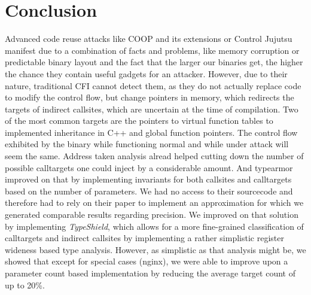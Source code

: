\chapter{Conclusion}
\label{chapter:Conclusion}
Advanced code reuse attacks like COOP and its extensions or Control Jujutsu manifest due to a combination of facts and problems, 
like memory corruption or predictable binary layout and the fact that the larger our binaries get, the 
higher the chance they contain useful gadgets for an attacker. However, due to their nature, traditional 
CFI cannot detect them, as they do not actually replace code to modify the control flow, but change pointers
in memory, which redirects the targets of indirect callsites, which are uncertain at the time of compilation. 
Two of the most common targets are the pointers to virtual function tables to implemented inheritance in C++ 
and global function pointers. The control flow exhibited by the binary while functioning normal and while 
under attack will seem the same. Address taken analysis alread helped cutting down the number of possible 
calltargets one could inject by a considerable amount. And typearmor improved on that by implementing 
invariants for both callsites and calltargets based on the number of parameters. We had no access to
their sourcecode and therefore had to rely on their paper to implement an approximation for which 
we generated comparable results regarding precision. We improved on that solution by implementing \textit{TypeShield}, 
which allows for a more fine-grained classification of calltargets and indirect callsites by implementing a rather 
simplistic register wideness based type analysis. However, as simplistic as that analysis might be, we showed that 
except for special cases (nginx), we were able to improve upon a parameter count based implementation by reducing 
the average target count of up to 20\%.


